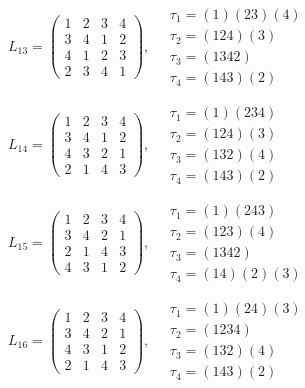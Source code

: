$L_{13} = \begin{pmatrix} 1 & 2 & 3 & 4 \\ 3 & 4 & 1 & 2 \\ 4 & 1 & 2 & 3 \\ 2 & 3 & 4 & 1 \end{pmatrix}, \quad \begin{matrix} \tau_{1} = (1)(2 3)(4) \\ \tau_{2} = (1 2 4)(3) \\ \tau_{3} = (1 3 4 2) \\ \tau_{4} = (1 4 3)(2) \end{matrix}$

$L_{14} = \begin{pmatrix} 1 & 2 & 3 & 4 \\ 3 & 4 & 1 & 2 \\ 4 & 3 & 2 & 1 \\ 2 & 1 & 4 & 3 \end{pmatrix}, \quad \begin{matrix} \tau_{1} = (1)(2 3 4) \\ \tau_{2} = (1 2 4)(3) \\ \tau_{3} = (1 3 2)(4) \\ \tau_{4} = (1 4 3)(2) \end{matrix}$

$L_{15} = \begin{pmatrix} 1 & 2 & 3 & 4 \\ 3 & 4 & 2 & 1 \\ 2 & 1 & 4 & 3 \\ 4 & 3 & 1 & 2 \end{pmatrix}, \quad \begin{matrix} \tau_{1} = (1)(2 4 3) \\ \tau_{2} = (1 2 3)(4) \\ \tau_{3} = (1 3 4 2) \\ \tau_{4} = (1 4)(2)(3) \end{matrix}$

$L_{16} = \begin{pmatrix} 1 & 2 & 3 & 4 \\ 3 & 4 & 2 & 1 \\ 4 & 3 & 1 & 2 \\ 2 & 1 & 4 & 3 \end{pmatrix}, \quad \begin{matrix} \tau_{1} = (1)(2 4)(3) \\ \tau_{2} = (1 2 3 4) \\ \tau_{3} = (1 3 2)(4) \\ \tau_{4} = (1 4 3)(2) \end{matrix}$

